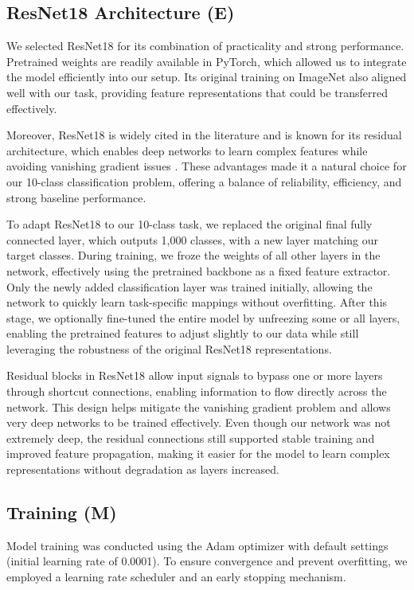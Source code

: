 \documentclass[a4paper]{article}
\begin{document}
\subsection{ResNet18 Architecture (E)}
We selected ResNet18 for its combination of practicality and strong performance. Pretrained weights are readily available in PyTorch, which allowed us to integrate the model efficiently into our setup. Its original training on ImageNet also aligned well with our task, providing feature representations that could be transferred effectively. 

Moreover, ResNet18 is widely cited in the literature and is known for its residual architecture, which enables deep networks to learn complex features while avoiding vanishing gradient issues \citep{liang2020image}. These advantages made it a natural choice for our 10-class classification problem, offering a balance of reliability, efficiency, and strong baseline performance. 

To adapt ResNet18 to our 10-class task, we replaced the original final fully connected layer, which outputs 1,000 classes, with a new layer matching our target classes. During training, we froze the weights of all other layers in the network, effectively using the pretrained backbone as a fixed feature extractor. Only the newly added classification layer was trained initially, allowing the network to quickly learn task-specific mappings without overfitting. After this stage, we optionally fine-tuned the entire model by unfreezing some or all layers, enabling the pretrained features to adjust slightly to our data while still leveraging the robustness of the original ResNet18 representations.

Residual blocks in ResNet18 allow input signals to bypass one or more layers through shortcut connections, enabling information to flow directly across the network. This design helps mitigate the vanishing gradient problem and allows very deep networks to be trained effectively. Even though our network was not extremely deep, the residual connections still supported stable training and improved feature propagation, making it easier for the model to learn complex representations without degradation as layers increased.






\subsection{Training (M)}
Model training was conducted using the Adam optimizer \citep{kingma2017} with default settings (initial learning rate of 0.0001). To ensure convergence and prevent overfitting, we employed a learning rate scheduler and an early stopping mechanism. 
\end{document}
